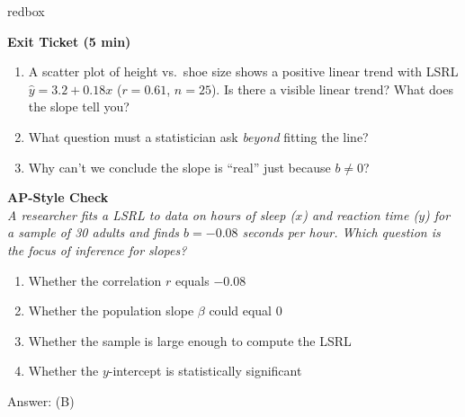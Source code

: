 \documentclass[10pt]{article}
\begin{document}
\begin{skillbox}{redbox}
\begin{minipage}[t]{0.48\linewidth}
    \textbf{Exit Ticket (5 min)}
    \begin{enumerate}
        \item A scatter plot of height vs.\ shoe size shows a positive linear trend
              with LSRL $\hat{y} = 3.2 + 0.18x$ ($r = 0.61$, $n = 25$).
              Is there a visible linear trend? What does the slope tell you?
        \item What question must a statistician ask \emph{beyond} fitting the line?
        \item Why can't we conclude the slope is ``real'' just because $b \ne 0$?
    \end{enumerate}
\end{minipage}
\hfill
\begin{minipage}[t]{0.48\linewidth}
    \textbf{AP-Style Check}\\
    \textit{A researcher fits a LSRL to data on hours of sleep ($x$) and reaction
    time ($y$) for a sample of 30 adults and finds $b = -0.08$ seconds per hour.
    Which question is the focus of inference for slopes?}
    \begin{enumerate}[label=(\Alph*)]
        \item Whether the correlation $r$ equals $-0.08$
        \item Whether the population slope $\beta$ could equal 0
        \item Whether the sample is large enough to compute the LSRL
        \item Whether the $y$-intercept is statistically significant
    \end{enumerate}
    Answer: (B)
\end{minipage}
\end{skillbox}
\end{document}
